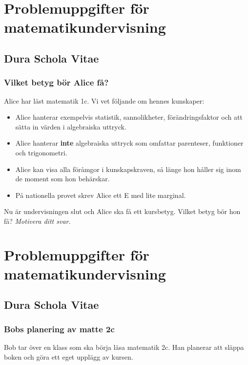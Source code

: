 \part*{Problemuppgifter för matematikundervisning}

\chapter{Dura Schola Vitae}

\setcounter{section}{0}
\section{Vilket betyg bör Alice få?}
Alice har läst matematik 1c. Vi vet följande om hennes kunskaper:

\begin{itemize}
  \item Alice hanterar exempelvis statistik, sannolikheter, förändringsfaktor och att sätta in värden i algebraiska uttryck.
  \item Alice hanterar \textbf{inte} algebraiska uttryck som omfattar parenteser, funktioner och trigonometri.
  \item Alice kan visa alla föråmgor i kunskapskraven, så länge hon håller sig inom de moment som hon behärskar.
  \item På nationella provet skrev Alice ett E med lite marginal.
\end{itemize}

\noindent Nu är undervisningen slut och Alice ska få ett kursbetyg. Vilket betyg bör hon få? \em{Motivera ditt svar.}




\part*{Problemuppgifter för matematikundervisning}

\chapter{Dura Schola Vitae}

\setcounter{section}{0}
\section{Bobs planering av matte 2c}
Bob tar över en klass som ska börja läsa matematik 2c. Han planerar att släppa boken och göra ett eget upplägg av kursen.

